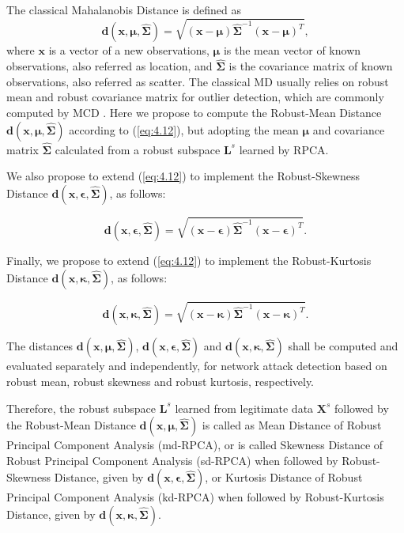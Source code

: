The classical Mahalanobis Distance is defined as		
\begin{equation}\label{eq:4.12}
	\pmb{d}(\pmb{x}, \pmb{\mu}, \hat{\pmb{\Sigma}}) = \sqrt{(\pmb{x} - \pmb{\mu}) \hat{\pmb{\Sigma}}^{-1}(\pmb{x} - \pmb{\mu})^T},
\end{equation}
where $\pmb{x}$ is a vector of a new observations, $\pmb{\mu}$ is the mean vector of known observations, also referred as location, and $\hat{\pmb{\Sigma}}$ is the covariance matrix of known observations, also referred as scatter. The classical MD usually relies on robust mean and robust covariance matrix for outlier detection, which are commonly computed by MCD \cite{rousseeuw1984mcd, rousseeuw1999fastmcd}. Here we propose to compute the Robust-Mean Distance $\pmb{d}(\pmb{x}, \pmb{\mu}, \hat{\pmb{\Sigma}})$ according to (\ref{eq:4.12}), but adopting the mean $\pmb{\mu}$ and covariance matrix $\hat{\pmb{\Sigma}}$ calculated from a robust subspace $\pmb{L}^s$ learned by RPCA.

We also propose to extend (\ref{eq:4.12}) to implement the Robust-Skewness Distance $\pmb{d}(\pmb{x}, \pmb{\epsilon}, \hat{\pmb{\Sigma}})$, as follows:

\begin{equation}\label{eq:4.13}
	\pmb{d}(\pmb{x}, \pmb{\epsilon}, \hat{\pmb{\Sigma}}) = \sqrt{(\pmb{x} - \pmb{\epsilon}) \hat{\pmb{\Sigma}}^{-1}(\pmb{x} - \pmb{\epsilon})^T}.
\end{equation}

Finally, we propose to extend (\ref{eq:4.12}) to implement the Robust-Kurtosis Distance $\pmb{d}(\pmb{x}, \pmb{\kappa}, \hat{\pmb{\Sigma}})$, as follows:

\begin{equation}\label{eq:4.14}
	\pmb{d}(\pmb{x}, \pmb{\kappa}, \hat{\pmb{\Sigma}}) = \sqrt{(\pmb{x} - \pmb{\kappa}) \hat{\pmb{\Sigma}}^{-1}(\pmb{x} - \pmb{\kappa})^T}.
\end{equation}

The distances $\pmb{d}(\pmb{x}, \pmb{\mu}, \hat{\pmb{\Sigma}})$, $\pmb{d}(\pmb{x}, \pmb{\epsilon}, \hat{\pmb{\Sigma}})$ and $\pmb{d}(\pmb{x}, \pmb{\kappa}, \hat{\pmb{\Sigma}})$ shall be computed and evaluated separately and independently, for network attack detection based on robust mean, robust skewness and robust kurtosis, respectively. 

Therefore, the robust subspace $\pmb{L}^s$ learned from legitimate data $\pmb{X}^s$ followed by the Robust-Mean Distance $\pmb{d}(\pmb{x}, \pmb{\mu}, \hat{\pmb{\Sigma}})$ is called as Mean Distance of Robust Principal Component Analysis (md-RPCA), or is called Skewness Distance of Robust Principal Component Analysis (sd-RPCA) when followed by Robust-Skewness Distance, given by $\pmb{d}(\pmb{x}, \pmb{\epsilon}, \hat{\pmb{\Sigma}})$, or Kurtosis Distance of Robust Principal Component Analysis (kd-RPCA) when followed by Robust-Kurtosis Distance, given by $\pmb{d}(\pmb{x}, \pmb{\kappa}, \hat{\pmb{\Sigma}})$.

